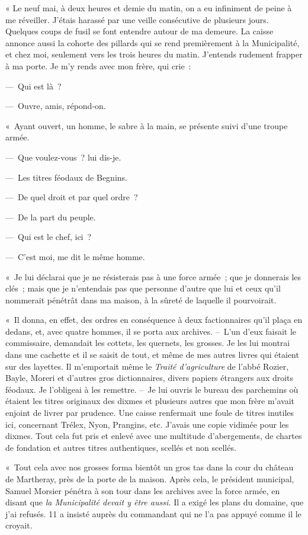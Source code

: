 \documentclass[french,twoside]{book} %
\newenvironment{quoteblock}%
  {\begin{quoting}}
  {\end{quoting}}
\newenvironment{quotebar}{%
    \def\FrameCommand{{\color{rubric!10!}\vrule width 0.5em} \hspace{0.9em}}%
    \def\OuterFrameSep{\itemsep} %
    \MakeFramed {\advance\hsize-\width \FrameRestore}
  }%
  {%
    \endMakeFramed
  }
\renewenvironment{quoteblock}%
  {%
    \savenotes
    \setstretch{0.9}
    \normalfont
    \begin{quotebar}
  }
  {%
    \end{quotebar}
    \spewnotes
  }
\begin{document}
\begin{quoteblock}
 \noindent « Le neuf mai, à deux heures et demie du matin, on a eu infiniment de peine à me réveiller. J’étais harassé par une veille consécutive de plusieurs jours. Quelques coups de fusil se font entendre autour de ma demeure. La caisse annonce aussi la cohorte des pillards qui se rend premièrement à la Municipalité, et chez moi, seulement vers les trois heures du matin. J’entends rudement frapper à ma porte. Je m’y rends avec mon frère, qui crie :\par
 — Qui est là ?\par
 — Ouvre, amis, répond-on.\par
 « Ayant ouvert, un homme, le sabre à la main, se présente suivi d’une troupe armée.\par
 — Que voulez-vous ? lui dis-je.\par
 — Les titres féodaux de Begnins.\par
 — De quel droit et par quel ordre ?\par
 — De la part du peuple.\par
 — Qui est le chef, ici ?\par
 — C’est moi, me dit le même homme.\par
 « Je lui déclarai que je ne résisterais pas à une force armée ; que je donnerais les clés ; mais que je n’entendais pas que personne d’autre que lui et ceux qu’il nommerait pénétrât dans ma maison, à la sûreté de laquelle il pourvoirait.\par
 « Il donna, en effet, des ordres en conséquence à deux factionnaires qu’il plaça en dedans, et, avec quatre hommes, il se porta aux archives. – L’un d’eux faisait le commissaire, demandait les cottets, les quernets, les grosses. Je les lui montrai dans une cachette et il se saisit de tout, et même de mes autres livres qui étaient sur des layettes. Il m’emportait même le \emph{Traité d’agriculture} de l’abbé Rozier, Bayle, Moreri et d’autres gros dictionnaires, divers papiers étrangers aux droits féodaux. Je l’obligeai à les remettre. – Je lui ouvris le bureau des parchemins où étaient les titres originaux des dixmes et plusieurs autres que mon frère m’avait enjoint de livrer par prudence. Une caisse renfermait une foule de titres inutiles ici, concernant Trélex, Nyon, Prangins, etc. J’avais une copie vidimée pour les dixmes. Tout cela fut pris et enlevé avec une multitude d’abergements, de chartes de fondation et autres titres authentiques, scellés et non scellés.\par
 « Tout cela avec nos grosses forma bientôt un gros tas dans la cour du château de Martheray, près de la porte de la maison. Après cela, le président municipal, Samuel Morsier pénétra à son tour dans les archives avec la force armée, en disant que \emph{la Municipalité devait y être aussi.} Il a exigé les plans du domaine, que j’ai refusés. 11 a insisté auprès du commandant qui ne l’a pas appuyé comme il le croyait.\par

\end{quoteblock}
\end{document}

